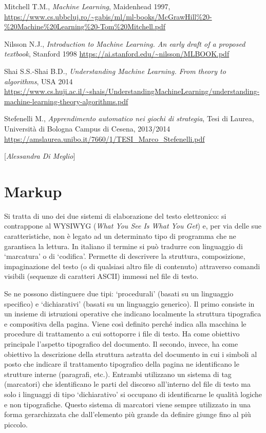 {{{Mitchell T.M., \emph{Machine Learning}, Maidenhead 1997,
\url{https://www.cs.ubbcluj.ro/~gabis/ml/ml-books/McGrawHill\%20-\%20Machine\%20Learning\%20-Tom\%20Mitchell.pdf}

Nilsson N.J., \emph{Introduction to Machine Learning. An early draft of
a proposed textbook}, Stanford 1998
\url{https://ai.stanford.edu/~nilsson/MLBOOK.pdf}

Shai S.S.-Shai B.D., \emph{Understanding Machine Learning. From theory
to algorithms}, USA 2014
\url{https://www.cs.huji.ac.il/~shais/UnderstandingMachineLearning/understanding-machine-learning-theory-algorithms.pdf}

Stefenelli M., \emph{Apprendimento automatico nei giochi di strategia},
Tesi di Laurea, Università di Bologna Campus di Cesena, 2013/2014
\url{https://amslaurea.unibo.it/7660/1/TESI_Marco_Stefenelli.pdf}
}

\hrulefill 

{[}\emph{Alessandra Di Meglio}{]}



\chapter{Markup}

Si tratta di uno dei due sistemi di elaborazione del testo elettronico:
si contrappone al WYSIWYG (\emph{What You See Is What You Get}) e, per
via delle sue caratteristiche, non è legato ad un determinato tipo di
programma che ne garantisca la lettura. In italiano il termine si può
tradurre con linguaggio di `marcatura' o di `codifica'. Permette di
descrivere la struttura, composizione, impaginazione del testo (o di
qualsiasi altro file di contenuto) attraverso comandi visibili (sequenze
di caratteri ASCII) immessi nel file di testo.

Se ne possono distinguere due tipi: `procedurali' (basati su un
linguaggio specifico) e `dichiarativi' (basati su un linguaggio
generico). Il primo consiste in un insieme di istruzioni operative che
indicano localmente la struttura tipografica e compositiva della pagina.
Viene così definito perché indica alla macchina le procedure di
trattamento a cui sottoporre i file di testo. Ha come obiettivo
principale l'aspetto tipografico del documento. Il secondo, invece, ha
come obiettivo la descrizione della struttura astratta del documento in
cui i simboli al posto che indicare il trattamento tipografico della
pagina ne identificano le strutture interne (paragrafi, etc.). Entrambi
utilizzano un sistema di tag (marcatori) che identificano le parti del
discorso all'interno del file di testo ma solo i linguaggi di tipo
`dichiarativo' si occupano di identificarne le qualità logiche e non
tipografiche. Questo sistema di marcatori viene sempre utilizzato in una
forma gerarchizzata che dall'elemento più grande da definire giunge fino
al più piccolo.

}}
